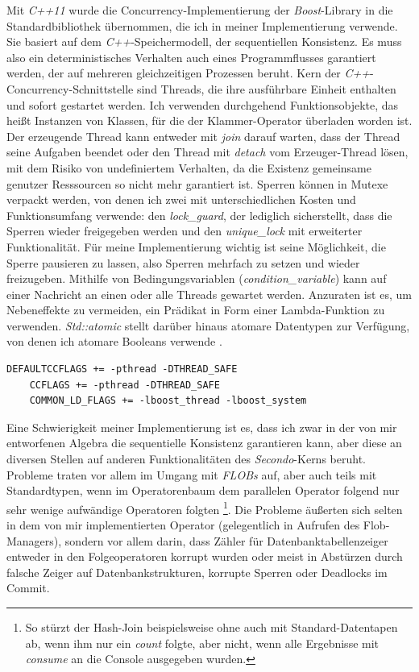 \documentclass[a4paper,12pt,twoside]{article}
\newcommand{\Fb}[1]{\textit{#1}} %
\begin{document}
Mit \Fb{C++11} wurde die Concurrency-Implementierung der \Fb{Boost}-Library in die Standardbibliothek übernommen, die ich in meiner Implementierung verwende. Sie basiert auf dem \Fb{C++}-Speichermodell, der sequentiellen Konsistenz. Es muss also ein deterministisches Verhalten auch eines Programmflusses garantiert werden, der auf mehreren gleichzeitigen Prozessen beruht. Kern der \Fb{C++}-Concurrency-Schnittstelle sind Threads, die ihre ausführbare Einheit enthalten und sofort gestartet werden. Ich verwenden durchgehend Funktionsobjekte, das heißt Instanzen von Klassen, für die der Klammer-Operator überladen worden ist. Der erzeugende Thread kann entweder mit \Fb{join} darauf warten, dass der Thread seine Aufgaben beendet oder den Thread mit \Fb{detach} vom Erzeuger-Thread lösen, mit dem Risiko von undefiniertem Verhalten, da die Existenz gemeinsame genutzer Resssourcen so nicht mehr garantiert ist. Sperren können in Mutexe verpackt werden, von denen ich zwei mit unterschiedlichen Kosten und Funktionsumfang verwende: den \Fb{lock\_guard}, der lediglich sicherstellt, dass die Sperren wieder freigegeben werden und den \Fb{unique\_lock} mit erweiterter Funktionalität. Für meine Implementierung wichtig ist seine Möglichkeit, die Sperre pausieren zu lassen, also Sperren mehrfach zu setzen und wieder freizugeben. Mithilfe von Bedingungsvariablen (\Fb{condition\_variable}) kann auf einer Nachricht an einen oder alle Threads gewartet werden. Anzuraten ist es, um Nebeneffekte zu vermeiden, ein Prädikat in Form einer Lambda-Funktion zu verwenden. \Fb{Std::atomic} stellt darüber hinaus atomare Datentypen zur Verfügung, von denen ich atomare Booleans verwende \parencite{Grimm2018}. 

\begin{minipage}{0.95\textwidth}
	\begin{lstlisting}[caption={Flags der \Fb{MThreaded}-Algebra.}, label=list:flags]
	DEFAULTCCFLAGS += -pthread -DTHREAD_SAFE
	CCFLAGS += -pthread -DTHREAD_SAFE
	COMMON_LD_FLAGS += -lboost_thread -lboost_system
	\end{lstlisting}
\end{minipage}

Eine Schwierigkeit meiner Implementierung ist es, dass ich zwar in der von mir entworfenen Algebra die sequentielle Konsistenz garantieren kann, aber diese an diversen Stellen auf anderen Funktionalitäten des \Fb{Secondo}-Kerns beruht. Probleme traten vor allem im Umgang mit \Fb{FLOBs} auf, aber auch teils mit Standardtypen, wenn im Operatorenbaum dem parallelen Operator folgend nur sehr wenige aufwändige Operatoren folgten \footnote{So stürzt der Hash-Join beispielsweise ohne auch mit Standard-Datentapen ab, wenn ihm nur ein \Fb{count} folgte, aber nicht, wenn alle Ergebnisse mit \Fb{consume} an die Console ausgegeben wurden.}. Die Probleme äußerten sich selten in dem von mir implementierten Operator (gelegentlich in Aufrufen des Flob-Managers), sondern vor allem darin, dass Zähler für Datenbanktabellenzeiger entweder in den Folgeoperatoren korrupt wurden oder meist in Abstürzen durch falsche Zeiger auf Datenbankstrukturen, korrupte Sperren oder Deadlocks im Commit. 
\end{document}
